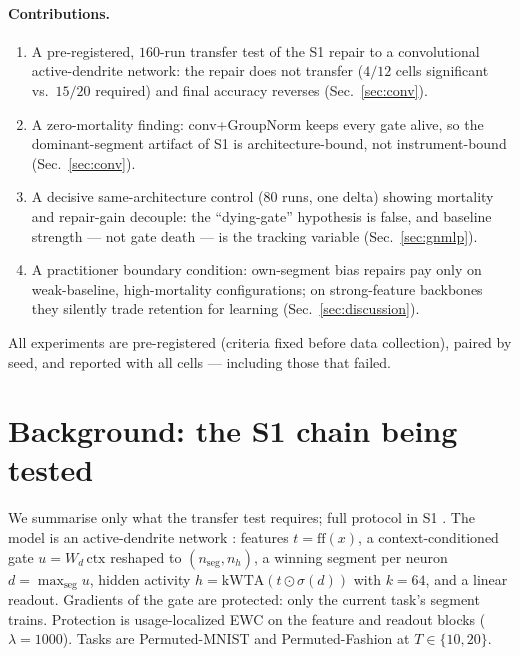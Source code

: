 \documentclass[review]{elsarticle}
\begin{document}
\paragraph{Contributions.}
\begin{enumerate}
\item A pre-registered, $160$-run transfer test of the S1 repair to a
convolutional active-dendrite network: the repair does not transfer
($4/12$ cells significant vs.\ $15/20$ required) and final accuracy
reverses (Sec.~\ref{sec:conv}).
\item A zero-mortality finding: conv+GroupNorm keeps every gate
alive, so the dominant-segment artifact of S1 is architecture-bound,
not instrument-bound (Sec.~\ref{sec:conv}).
\item A decisive same-architecture control ($80$ runs, one delta)
showing mortality and repair-gain decouple: the ``dying-gate''
hypothesis is false, and baseline strength --- not gate death --- is
the tracking variable (Sec.~\ref{sec:gnmlp}).
\item A practitioner boundary condition: own-segment bias repairs pay
only on weak-baseline, high-mortality configurations; on
strong-feature backbones they silently trade retention for learning
(Sec.~\ref{sec:discussion}).
\end{enumerate}

All experiments are pre-registered (criteria fixed before data
collection), paired by seed, and reported with all cells --- including
those that failed.

\section{Background: the S1 chain being tested}
\label{sec:background}

We summarise only what the transfer test requires; full protocol in
S1 \cite{zhou2026delpS1}. The model is an active-dendrite network
\cite{iyer2022}: features $t = \mathrm{ff}(x)$, a context-conditioned
gate $u = W_d\,\mathrm{ctx}$ reshaped to $(n_{\mathrm{seg}}, n_h)$, a
winning segment per neuron $d = \max_{\mathrm{seg}} u$, hidden
activity $h = \mathrm{kWTA}(t \odot \sigma(d))$ with $k{=}64$, and a
linear readout. Gradients of the gate are protected: only the current
task's segment trains. Protection is usage-localized EWC on the
feature and readout blocks ($\lambda{=}1000$). Tasks are
Permuted-MNIST and Permuted-Fashion at $T \in \{10, 20\}$.
\end{document}

